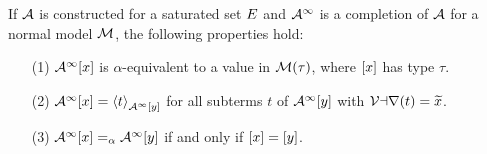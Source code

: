 \begin{lemma}
\label{lem:model-completion}
If $\Val$ is constructed for a saturated set $\Ec$
and $\Val^\AST$ is a completion of $\Val$ for a normal model $\M$, the following properties hold:
\begin{enumerate}
\item[\rm (1)] $\Val^\AST \ec{x}$ is $\alpha$-equivalent to a value in $\M( \tau )$, where $\ec{x}$ has type $\tau$.
\item[\rm (2)]
$\Val^\AST \ec{x} = \interp{\Val^\AST \ec{y}}{ t }$ for
all subterms $t$ of $\Val^\AST \ec{y}$ with $\muvar(t) = {\Varec{x}}$. 
\item[\rm (3)]
$\Val^\AST \ec{x} \vsim \Val^\AST \ec{y}$ if and only if $\ec{x} = \ec{y}$.
\end{enumerate}
\end{lemma}
